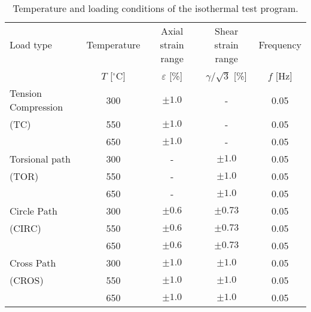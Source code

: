 \documentclass[preprint,5p,twocolumn,11pt,sort&compress]{elsarticle}
\begin{document}
\begin{table*}[htbp]
  \centering
  \caption{Temperature and loading conditions of the isothermal test program.}
    \begin{tabular}{lcccc}
    \hline
    Load type & Temperature & Axial strain range  & Shear strain range & Frequency\\
              & $T$ [$^{\circ}$C] & $\varepsilon$ [\%]& $\gamma /\sqrt 3$ [\%] & $f$ [Hz]  \\
    \hline
    Tension Compression   & 300 & $\pm1.0$ & - & 0.05 \\
    (TC)         & 550 & $\pm1.0$ & - & 0.05 \\
                 & 650 & $\pm1.0$ & - & 0.05 \\
    \hline
    Torsional path & 300 & - & $\pm1.0$ & 0.05 \\
    (TOR)       & 550 & - & $\pm1.0$ & 0.05 \\
                & 650 & - & $\pm1.0$ & 0.05 \\
    \hline
    Circle Path & 300 & $\pm0.6$ & $\pm0.73$ & 0.05 \\
    (CIRC)      & 550 & $\pm0.6$ & $\pm0.73$ & 0.05 \\
                & 650 & $\pm0.6$ & $\pm0.73$ & 0.05 \\
    \hline
    Cross Path   & 300 & $\pm1.0$ & $\pm1.0$ & 0.05 \\
    (CROS)       & 550 & $\pm1.0$ & $\pm1.0$ & 0.05 \\
                 & 650 & $\pm1.0$ & $\pm1.0$ & 0.05 \\
    \hline
    \end{tabular}%
  \label{tab:Loading-Conditions-IF}%
\end{table*}%
\end{document}

